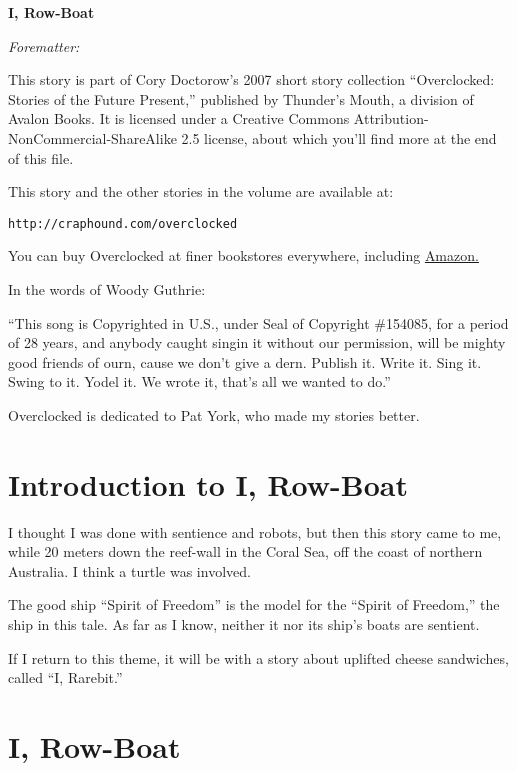 


\begin{center}
\textbf{\huge\textsf{{I, Row-Boat}}}
\end{center}

\emph{Forematter:}

This story is part of Cory Doctorow’s 2007 short story collection
“Overclocked: Stories of the Future Present,” published by
Thunder’s Mouth, a division of Avalon Books. It is licensed under a
Creative Commons Attribution-NonCommercial-ShareAlike 2.5 license,
about which you’ll find more at the end of this file.

This story and the other stories in the volume are available at:

\texttt{http://craphound.com/overclocked}

You can buy Overclocked at finer bookstores everywhere, including
\href{http://www.amazon.com/exec/obidos/ASIN/1560259817/downandoutint-20}{Amazon.}

In the words of Woody Guthrie:

“This song is Copyrighted in U.S., under Seal of Copyright
\#154085, for a period of 28 years, and anybody caught singin it
without our permission, will be mighty good friends of ourn, cause
we don’t give a dern. Publish it. Write it. Sing it. Swing to it.
Yodel it. We wrote it, that’s all we wanted to do.”

Overclocked is dedicated to Pat York, who made my stories better.

\section{Introduction to I, Row-Boat}

I thought I was done with sentience and robots, but then this story
came to me, while 20 meters down the reef-wall in the Coral Sea,
off the coast of northern Australia. I think a turtle was
involved.

The good ship “Spirit of Freedom” is the model for the “Spirit of
Freedom,” the ship in this tale. As far as I know, neither it nor
its ship’s boats are sentient.

If I return to this theme, it will be with a story about uplifted
cheese sandwiches, called “I, Rarebit.”

\section{I, Row-Boat}

